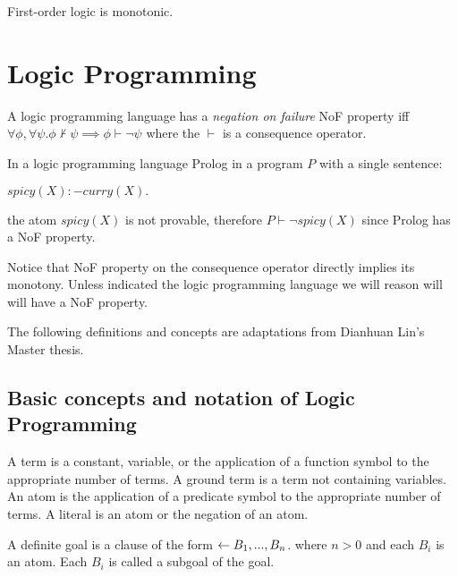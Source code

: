 \begin{exmp}
First-order logic is monotonic.
\end{exmp}

\section{Logic Programming}

\begin{defn}
A logic programming language has a \emph{negation on failure}\cite{clark1978negation} NoF property iff $\forall \phi, \forall \psi. \phi \not\vdash \psi \implies \phi \vdash \neg\psi$ where the $\vdash$ is a consequence operator.
\end{defn}

\begin{exmp}
In a logic programming language Prolog in a program $P$ with a single sentence:

$spicy(X) :- curry(X).$

the atom $spicy(X)$ is not provable, therefore $P \vdash \neg spicy(X)$ since Prolog has a NoF property.
\end{exmp}

Notice that NoF property on the consequence operator directly implies its monotony. Unless indicated the logic programming language we will reason will will have a NoF property.

The following definitions and concepts are adaptations from Dianhuan Lin's Master thesis\cite{lin2009efficient}.

\subsection{Basic concepts and notation of Logic Programming\cite{lin2009efficient}}

\begin{defn}
A term is a constant, variable, or the application of a function symbol to the appropriate number of terms. A ground term is a term not containing variables.
An atom is the application of a predicate symbol to the appropriate number of terms. A literal is an atom or the negation of an atom.
\end{defn}

\begin{defn}
A definite goal is a clause of the form
$\leftarrow B_1 , ..., B_n$.
where $n > 0$ and each $B_i$ is an atom.
Each $B_i$ is called a subgoal of the goal.
\end{defn}

